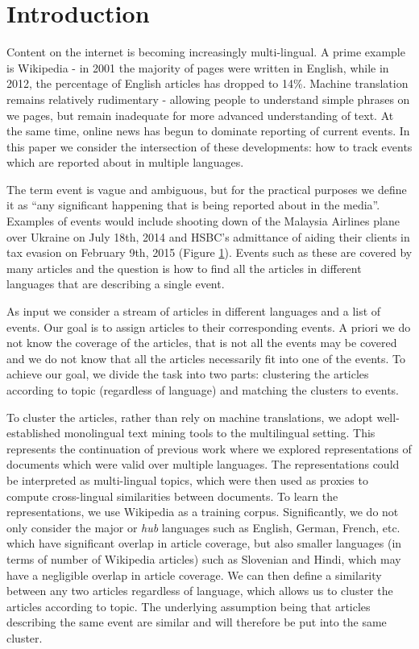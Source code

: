 \documentclass[twoside,11pt]{article}
\begin{document}
\section{Introduction}

Content on the internet is becoming increasingly multi-lingual. A prime example is Wikipedia - in 2001 the majority of pages were written in English, while in 2012, the percentage of English articles has dropped to 14\%. Machine translation remains relatively rudimentary - allowing people to understand simple phrases on we pages, but remain inadequate for more advanced understanding of text. At the same time, online news has begun to dominate reporting of current events. In this paper we consider the intersection of these developments: how to track events which are reported about in multiple languages.

The term event is vague and ambiguous, but for the practical purposes we define it as ``any significant happening that is being reported about in the media''. Examples of events would include shooting down of the Malaysia Airlines plane over Ukraine on July 18th, 2014 and HSBC's admittance of aiding their clients in tax evasion on February 9th, 2015 (Figure \ref{}). Events such as these are covered by many articles and the question is how to find all the articles in different languages that are describing a single event.

As input we consider a stream of articles in different languages and a list of events. Our goal is to assign articles to their corresponding events. A priori we do not know the coverage of the articles, that is not all the events may be covered and we do not know that all the articles necessarily fit into one of the events.  To achieve our goal, we divide the task into two parts: clustering the articles according to topic (regardless of language) and matching the clusters to events.

To cluster the articles, rather than rely on machine translations, we adopt well-established monolingual text mining tools to the multilingual setting. This represents the continuation of previous work \cite{nips, iti, nips2, sikdd} where we explored representations of documents which were valid over multiple languages.  The representations could be interpreted as multi-lingual topics, which were then used as proxies to compute cross-lingual similarities between documents. To learn the representations, we use Wikipedia as a training corpus. Significantly, we do not only consider the major or \emph{hub} languages such as English, German, French, etc. which have significant overlap in article coverage, but also smaller languages (in terms of number of Wikipedia articles) such as Slovenian and Hindi, which may have a negligible overlap in article coverage. We can then define a similarity between any two articles regardless of language,  which allows us to cluster the articles according to topic. The underlying assumption being that articles describing the same event are similar  and will therefore be put into the same cluster.
\end{document}
